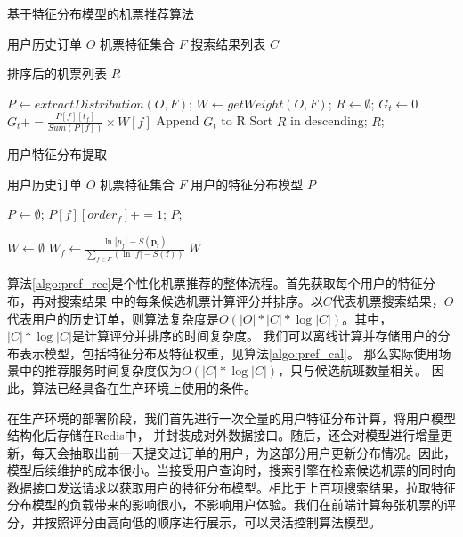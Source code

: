 \begin{algorithm}
\caption{基于特征分布模型的机票推荐算法}
\label{algo:pref_rec}
\begin{algorithmic}[1]
\Require
\Statex 用户历史订单 $O$
\Statex 机票特征集合 $F$
\Statex 搜索结果列表 $C$

\Ensure 
\Statex 排序后的机票列表 $R$

\State $P \gets extractDistribution(O,F)$;
\State $W \gets getWeight(O,F)$;
\State $R \gets \emptyset$;
\State $G_t \gets 0$
\State $G_t += \frac{P[f][t_f]}{Sum(P[f])} \times W[f] $
\EndFor
\State Append $G_t$ to R
\EndFor 
\State Sort $R$ in descending;
\State \Return $R$;
\end{algorithmic}
\end{algorithm}


\begin{algorithm}
\caption{用户特征分布提取}
\label{algo:pref_cal}
\begin{algorithmic}[1]
\Require
\Statex 用户历史订单 $O$
\Statex 机票特征集合 $F$
\Ensure
\Statex 用户的特征分布模型 $P$

\State $P \gets \emptyset$;
\State $P[f][order_f] += 1$;
\EndFor	
\EndFor 
\State \Return $P$;
\EndFunction

\State $W \gets \emptyset$
\State $W_f \gets \frac{\ln |p_f| - S(\mathbf{p_f})}{\sum_{f \in F}(\ln |f| - S(\mathbf{f}))}$
\EndFor
\State \Return $W$
\EndFunction

\end{algorithmic}
\end{algorithm}\par

算法\ref{algo:pref_rec}是个性化机票推荐的整体流程。首先获取每个用户的特征分布，再对搜索结果
中的每条候选机票计算评分并排序。以$C$代表机票搜索结果，$O$代表用户的历史订单，则算法复杂度是$O(|O|*|C|*\log|C|)$。其中，$|C|*\log|C|$是计算评分并排序的时间复杂度。
我们可以离线计算并存储用户的分布表示模型，包括特征分布及特征权重，见算法\ref{algo:pref_cal}。
那么实际使用场景中的推荐服务时间复杂度仅为$O(|C|*\log|C|)$，只与候选航班数量相关。
因此，算法已经具备在生产环境上使用的条件。\par
在生产环境的部署阶段，我们首先进行一次全量的用户特征分布计算，将用户模型结构化后存储在Redis中，
并封装成对外数据接口。随后，还会对模型进行增量更新，每天会抽取出前一天提交过订单的用户，为这部分用户更新分布情况。因此，模型后续维护的成本很小。当接受用户查询时，搜索引擎在检索候选机票的同时向数据接口发送请求以获取用户的特征分布模型。相比于上百项搜索结果，拉取特征分布模型的负载带来的影响很小，不影响用户体验。我们在前端计算每张机票的评分，并按照评分由高向低的顺序进行展示，可以灵活控制算法模型。\par

